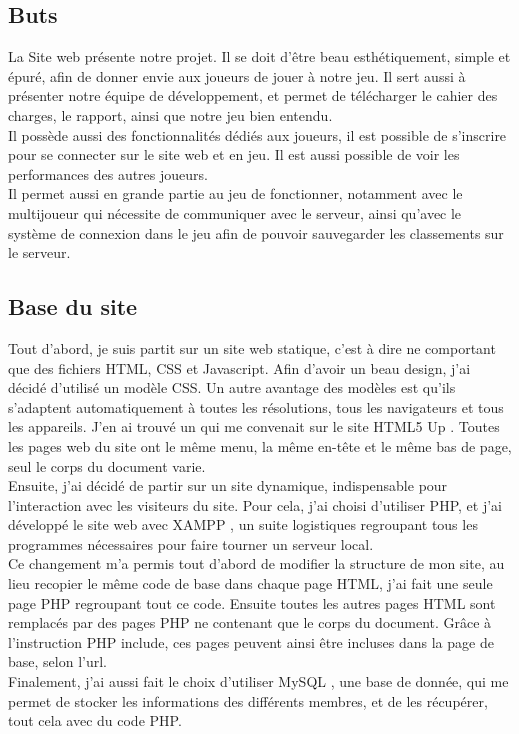 \documentclass[12pt]{article}
\begin{document}
\subsection{Buts}

La Site web présente notre projet. Il se doit d'être beau esthétiquement, simple et épuré, afin de donner envie aux joueurs de jouer à notre jeu. Il sert aussi à présenter notre équipe de développement, et permet de télécharger le cahier des charges, le rapport, ainsi que notre jeu bien entendu.\\
Il possède aussi des fonctionnalités dédiés aux joueurs, il est possible de s'inscrire pour se connecter sur le site web et en jeu. Il est aussi possible de voir les performances des autres joueurs.\\
Il permet aussi en grande partie au jeu de fonctionner, notamment avec le multijoueur qui nécessite de communiquer avec le serveur, ainsi qu'avec le système de connexion dans le jeu afin de pouvoir sauvegarder les classements sur le serveur.

\subsection{Base du site}

Tout d'abord, je suis partit sur un site web statique, c'est à dire ne comportant que des fichiers \gls{HTML}, \gls{CSS} et \gls{Javascript}. Afin d'avoir un beau design, j'ai décidé d'utilisé un modèle CSS. Un autre avantage des modèles est qu'ils s'adaptent automatiquement à toutes les résolutions, tous les navigateurs et tous les appareils. J'en ai trouvé un qui me convenait sur le site HTML5 Up \cite{html5up}. Toutes les pages web du site ont le même menu, la même en-tête et le même bas de page, seul le corps du document varie.\\

Ensuite, j'ai décidé de partir sur un site dynamique, indispensable pour l'interaction avec les visiteurs du site. Pour cela, j'ai choisi d'utiliser \gls{PHP}, et j'ai développé le site web avec XAMPP \cite{xampp}, un suite logistiques regroupant tous les programmes nécessaires pour faire tourner un serveur local.\\
Ce changement m'a permis tout d'abord de modifier la structure de mon site, au lieu recopier le même code de base dans chaque page HTML, j'ai fait une seule page PHP regroupant tout ce code. Ensuite toutes les autres pages HTML sont remplacés par des pages PHP ne contenant que le corps du document. Grâce à l'instruction PHP include, ces pages peuvent ainsi être incluses dans la page de base, selon l'url.\\
Finalement, j'ai aussi fait le choix d'utiliser MySQL \cite{mysql}, une base de donnée, qui me permet de stocker les informations des différents membres, et de les récupérer, tout cela avec du code PHP.
\end{document}
